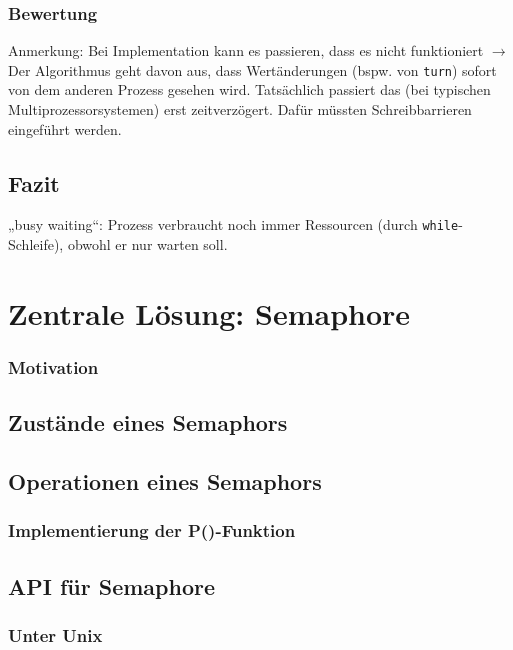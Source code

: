 \subsubsection*{Bewertung}
Anmerkung: Bei Implementation kann es passieren, dass es nicht funktioniert $\to$ Der Algorithmus geht davon aus, dass Wertänderungen (bspw. von \lstinline$turn$) sofort von dem anderen Prozess gesehen wird. Tatsächlich passiert das (bei typischen Multiprozessorsystemen) erst zeitverzögert. Dafür müssten Schreibbarrieren eingeführt werden.
\subsection{Fazit}
„busy waiting“: Prozess verbraucht noch immer Ressourcen (durch \lstinline$while$-Schleife), obwohl er nur warten soll.

\section{Zentrale Lösung: Semaphore}
\subsubsection*{Motivation}

\subsection{Zustände eines Semaphors}

\subsection{Operationen eines Semaphors}

\subsubsection*{Implementierung der P()-Funktion}

\subsection{API für Semaphore}
\subsubsection*{Unter Unix}
